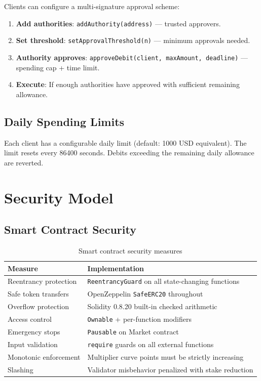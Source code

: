 \documentclass[11pt,a4paper]{article}
\begin{document}
Clients can configure a multi-signature approval scheme:
\begin{enumerate}
    \item \textbf{Add authorities}: \texttt{addAuthority(address)} --- trusted approvers.
    \item \textbf{Set threshold}: \texttt{setApprovalThreshold(n)} --- minimum approvals needed.
    \item \textbf{Authority approves}: \texttt{approveDebit(client, maxAmount, deadline)} --- spending cap + time limit.
    \item \textbf{Execute}: If enough authorities have approved with sufficient remaining allowance.
\end{enumerate}

\subsection{Daily Spending Limits}

Each client has a configurable daily limit (default: 1000 USD equivalent). The limit resets every 86400 seconds. Debits exceeding the remaining daily allowance are reverted.

\section{Security Model}
\label{sec:security}

\subsection{Smart Contract Security}

\begin{table}[H]
\centering
\begin{tabularx}{\textwidth}{lX}
\toprule
\textbf{Measure} & \textbf{Implementation} \\
\midrule
Reentrancy protection & \texttt{ReentrancyGuard} on all state-changing functions \\
Safe token transfers & OpenZeppelin \texttt{SafeERC20} throughout \\
Overflow protection & Solidity 0.8.20 built-in checked arithmetic \\
Access control & \texttt{Ownable} + per-function modifiers \\
Emergency stops & \texttt{Pausable} on Market contract \\
Input validation & \texttt{require} guards on all external functions \\
Monotonic enforcement & Multiplier curve points must be strictly increasing \\
Slashing & Validator misbehavior penalized with stake reduction \\
\bottomrule
\end{tabularx}
\caption{Smart contract security measures}
\end{table}
\end{document}
